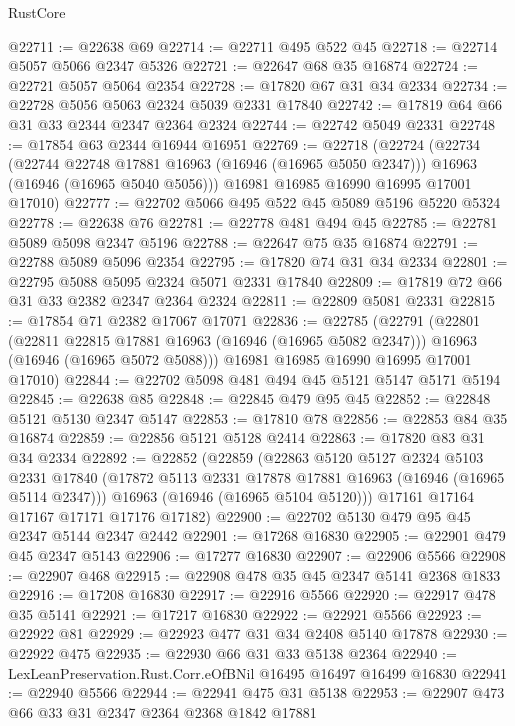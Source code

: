 \begin{lexlean}{RustCore}
\begin{coremodule}
@22711 := @22638 @69
@22714 := @22711 @495 @522 @45
@22718 := @22714 @5057 @5066 @2347 @5326
@22721 := @22647 @68 @35 @16874
@22724 := @22721 @5057 @5064 @2354
@22728 := @17820 @67 @31 @34 @2334
@22734 := @22728 @5056 @5063 @2324 @5039 @2331 @17840
@22742 := @17819 @64 @66 @31 @33 @2344 @2347 @2364 @2324
@22744 := @22742 @5049 @2331
@22748 := @17854 @63 @2344 @16944 @16951
@22769 := @22718
    (@22724
      (@22734
        (@22744 @22748 @17881 @16963 (@16946 (@16965 @5050 @2347)))
        @16963
        (@16946 (@16965 @5040 @5056)))
      @16981
      @16985
      @16990
      @16995
      @17001
      @17010)
@22777 := @22702 @5066 @495 @522 @45 @5089 @5196 @5220 @5324
@22778 := @22638 @76
@22781 := @22778 @481 @494 @45
@22785 := @22781 @5089 @5098 @2347 @5196
@22788 := @22647 @75 @35 @16874
@22791 := @22788 @5089 @5096 @2354
@22795 := @17820 @74 @31 @34 @2334
@22801 := @22795 @5088 @5095 @2324 @5071 @2331 @17840
@22809 := @17819 @72 @66 @31 @33 @2382 @2347 @2364 @2324
@22811 := @22809 @5081 @2331
@22815 := @17854 @71 @2382 @17067 @17071
@22836 := @22785
    (@22791
      (@22801
        (@22811 @22815 @17881 @16963 (@16946 (@16965 @5082 @2347)))
        @16963
        (@16946 (@16965 @5072 @5088)))
      @16981
      @16985
      @16990
      @16995
      @17001
      @17010)
@22844 := @22702 @5098 @481 @494 @45 @5121 @5147 @5171 @5194
@22845 := @22638 @85
@22848 := @22845 @479 @95 @45
@22852 := @22848 @5121 @5130 @2347 @5147
@22853 := @17810 @78
@22856 := @22853 @84 @35 @16874
@22859 := @22856 @5121 @5128 @2414
@22863 := @17820 @83 @31 @34 @2334
@22892 := @22852
    (@22859
      (@22863
        @5120
        @5127
        @2324
        @5103
        @2331
        @17840
        (@17872 @5113 @2331 @17878 @17881 @16963 (@16946 (@16965 @5114 @2347)))
        @16963
        (@16946 (@16965 @5104 @5120)))
      @17161
      @17164
      @17167
      @17171
      @17176
      @17182)
@22900 := @22702 @5130 @479 @95 @45 @2347 @5144 @2347 @2442
@22901 := @17268 @16830
@22905 := @22901 @479 @45 @2347 @5143
@22906 := @17277 @16830
@22907 := @22906 @5566
@22908 := @22907 @468
@22915 := @22908 @478 @35 @45 @2347 @5141 @2368 @1833
@22916 := @17208 @16830
@22917 := @22916 @5566
@22920 := @22917 @478 @35 @5141
@22921 := @17217 @16830
@22922 := @22921 @5566
@22923 := @22922 @81
@22929 := @22923 @477 @31 @34 @2408 @5140 @17878
@22930 := @22922 @475
@22935 := @22930 @66 @31 @33 @5138 @2364
@22940 := LexLeanPreservation.Rust.Corr.eOfBNil @16495 @16497 @16499 @16830
@22941 := @22940 @5566
@22944 := @22941 @475 @31 @5138
@22953 := @22907 @473 @66 @33 @31 @2347 @2364 @2368 @1842 @17881

\end{coremodule}
\end{lexlean}
